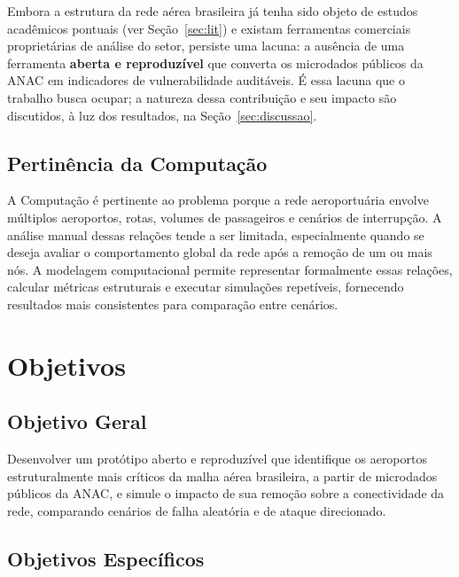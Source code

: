 \documentclass[12pt,a4paper]{article}
\begin{document}
Embora a estrutura da rede aérea brasileira já tenha sido objeto de estudos acadêmicos pontuais
(ver Seção~\ref{sec:lit}) e existam ferramentas comerciais proprietárias de análise do setor,
persiste uma lacuna: a ausência de uma ferramenta \textbf{aberta e reproduzível} que converta os
microdados públicos da ANAC em indicadores de vulnerabilidade auditáveis. É essa lacuna que o
trabalho busca ocupar; a natureza dessa contribuição e seu impacto são discutidos, à luz dos
resultados, na Seção~\ref{sec:discussao}.

\subsection{Pertinência da Computação}

A Computação é pertinente ao problema porque a rede aeroportuária envolve múltiplos aeroportos,
rotas, volumes de passageiros e cenários de interrupção. A análise manual dessas relações tende a
ser limitada, especialmente quando se deseja avaliar o comportamento global da rede após a
remoção de um ou mais nós. A modelagem computacional permite representar formalmente essas
relações, calcular métricas estruturais e executar simulações repetíveis, fornecendo resultados
mais consistentes para comparação entre cenários.

\section{Objetivos}

\subsection{Objetivo Geral}

Desenvolver um protótipo aberto e reproduzível que identifique os aeroportos estruturalmente mais
críticos da malha aérea brasileira, a partir de microdados públicos da ANAC, e simule o impacto de
sua remoção sobre a conectividade da rede, comparando cenários de falha aleatória e de ataque
direcionado.

\subsection{Objetivos Específicos}
\end{document}
